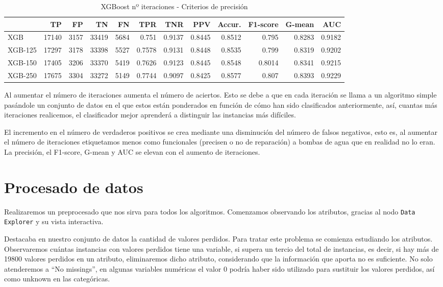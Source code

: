 \documentclass[a4paper, 20pt]{article}
\begin{document}
\begin{table}[H]
\centering
\caption{XGBoost nº iteraciones - Criterios de precisión}
\label{tab:xgbmod}
\begin{tabular}{lrrrrrrrrrrr}
\toprule
 & TP & FP & TN & FN & TPR & TNR & PPV & Accur. & F1-score & G-mean & AUC\\ \midrule
XGB & 17140 & 3157 & 33419 & 5684 & 0.751 & 0.9137 & 0.8445 & 0.8512 & 0.795 & 0.8283 & 0.9182\\
XGB-125 & 17297 & 3178 & 33398 & 5527 & 0.7578 & 0.9131 & 0.8448 & 0.8535 & 0.799 & 0.8319 & 0.9202\\
XGB-150 & 17405 & 3206 & 33370 & 5419 & 0.7626 & 0.9123 & 0.8445 & 0.8548 & 0.8014 & 0.8341 & 0.9215\\
XGB-250 & 17675 & 3304 & 33272 & 5149 & 0.7744 & 0.9097 & 0.8425 & 0.8577 & 0.807 & 0.8393 & 0.9229\\
\bottomrule
\end{tabular}
\end{table}

Al aumentar el número de iteraciones aumenta el número de aciertos. Esto se debe a que en cada iteración se llama a un algoritmo simple pasándole un conjunto de datos en el que estos están ponderados en función de cómo han sido clasificados anteriormente, así, cuantas más iteraciones realicemos, el clasificador mejor aprenderá a distinguir las instancias más difíciles.

El incremento en el número de verdaderos positivos se crea mediante una disminución del número de falsos negativos, esto es, al aumentar el número de iteraciones etiquetamos menos como funcionales (precisen o no de reparación) a bombas de agua que en realidad no lo eran. La precisión, el F1-score, G-mean y AUC se elevan con el aumento de iteraciones.

\section{Procesado de datos}
\label{Preprocesado}
Realizaremos un preprocesado que nos sirva para todos los algoritmos.
Comenzamos observando los atributos, gracias al nodo \texttt{Data Explorer} y su vista interactiva.

Destacaba en nuestro conjunto de datos la cantidad de valores perdidos. Para tratar este problema se comienza estudiando los atributos. Observaremos cuántas instancias con valores perdidos tiene una variable, si supera un tercio del total de instancias, es decir, si hay más de 19800 valores perdidos en un atributo, eliminaremos dicho atributo, considerando que la información que aporta no es suficiente. No solo atenderemos a ``No missings'', en algunas variables numéricas el valor 0 podría haber sido utilizado para sustituir los valores perdidos, así como unknown en las categóricas.
\end{document}
